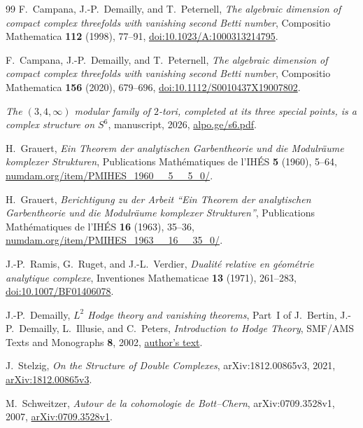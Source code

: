 \documentclass[11pt]{article}
\numberwithin{equation}{section}
\begin{document}
\begin{thebibliography}{99}
F.~Campana, J.-P.~Demailly, and T.~Peternell,
\emph{The algebraic dimension of compact complex threefolds with
vanishing second Betti number},
Compositio Mathematica \textbf{112} (1998), 77--91,
\href{https://doi.org/10.1023/A:1000313214795}
{doi:10.1023/A:1000313214795}.

F.~Campana, J.-P.~Demailly, and T.~Peternell,
\emph{The algebraic dimension of compact complex threefolds with
vanishing second Betti number},
Compositio Mathematica \textbf{156} (2020), 679--696,
\href{https://doi.org/10.1112/S0010437X19007802}
{doi:10.1112/S0010437X19007802}.

\emph{The $(3,4,\infty)$ modular family of $2$-tori, completed at
its three special points, is a complex structure on $S^6$},
manuscript, 2026,
\href{https://alpo.ge/s6.pdf}{alpo.ge/s6.pdf}.

H.~Grauert,
\emph{Ein Theorem der analytischen Garbentheorie und die
Modulr\"aume komplexer Strukturen},
Publications Math\'ematiques de l'IH\'ES \textbf{5} (1960), 5--64,
\href{https://www.numdam.org/item/PMIHES_1960__5__5_0/}
{numdam.org/item/PMIHES\_1960\_\_5\_\_5\_0/}.

H.~Grauert,
\emph{Berichtigung zu der Arbeit ``Ein Theorem der analytischen
Garbentheorie und die Modulr\"aume komplexer Strukturen''},
Publications Math\'ematiques de l'IH\'ES \textbf{16} (1963), 35--36,
\href{https://www.numdam.org/item/PMIHES_1963__16__35_0/}
{numdam.org/item/PMIHES\_1963\_\_16\_\_35\_0/}.

J.-P.~Ramis, G.~Ruget, and J.-L.~Verdier,
\emph{Dualit\'e relative en g\'eom\'etrie analytique complexe},
Inventiones Mathematicae \textbf{13} (1971), 261--283,
\href{https://doi.org/10.1007/BF01406078}
{doi:10.1007/BF01406078}.

J.-P.~Demailly,
\emph{$L^2$ Hodge theory and vanishing theorems},
Part~I of J.~Bertin, J.-P.~Demailly, L.~Illusie, and C.~Peters,
\emph{Introduction to Hodge Theory},
SMF/AMS Texts and Monographs \textbf{8}, 2002,
\href{https://www-fourier.univ-grenoble-alpes.fr/~demailly/manuscripts/hodge-ams.pdf}
{author's text}.

J.~Stelzig,
\emph{On the Structure of Double Complexes},
arXiv:1812.00865v3, 2021,
\href{https://arxiv.org/abs/1812.00865v3}{arXiv:1812.00865v3}.

M.~Schweitzer,
\emph{Autour de la cohomologie de Bott--Chern},
arXiv:0709.3528v1, 2007,
\href{https://arxiv.org/abs/0709.3528v1}{arXiv:0709.3528v1}.


\end{thebibliography}
\end{document}
